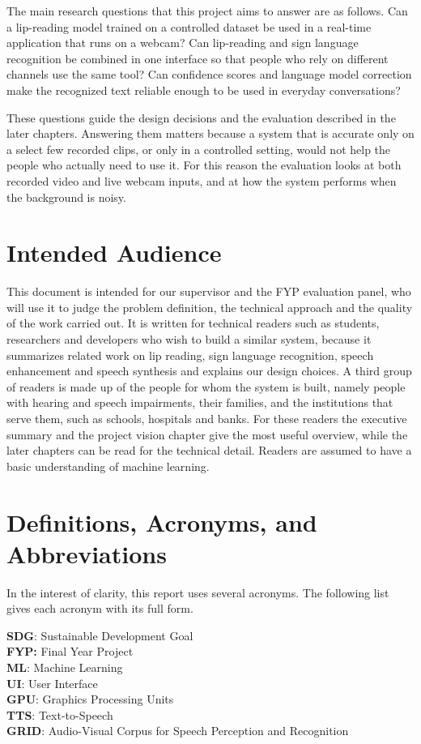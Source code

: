 \documentclass{FastFyp}
\begin{document}
The main research questions that this project aims to answer are as follows. 
Can a lip-reading model trained on a controlled dataset be used in a real-time application that runs on a webcam? 
Can lip-reading and sign language recognition be combined in one interface so that people who rely on different channels use the same tool? 
Can confidence scores and language model correction make the recognized text reliable enough to be used in everyday conversations? 

These questions guide the design decisions and the evaluation described in the later chapters. Answering them matters because a system that is accurate only on a select few recorded clips, or only in a controlled setting, would not help the people who actually need to use it. 
For this reason the evaluation looks at both recorded video and live webcam inputs, and at how the system performs when the background is noisy.

\section{Intended Audience}
This document is intended for our supervisor and the FYP evaluation panel, who will use it to judge the problem definition, the technical approach and the quality of the work carried out. It is written for technical readers such as students, researchers and developers who wish to build a similar system, because it summarizes related work on lip reading, sign language recognition, speech enhancement and speech synthesis and explains our design choices. A third group of readers is made up of the people for whom the system is built, namely people with hearing and speech impairments, their families, and the institutions that serve them, such as schools, hospitals and banks. For these readers the executive summary and the project vision chapter give the most useful overview, while the later chapters can be read for the technical detail. Readers are assumed to have a basic understanding of machine learning.
\section{Definitions, Acronyms, and Abbreviations}
In the interest of clarity, this report uses several acronyms. The following list gives each acronym with its full form.

\textbf{SDG}: Sustainable Development Goal\\
\textbf{FYP:} Final Year Project\\
\textbf{ML}: Machine Learning\\
\textbf{UI}: User Interface\\
\textbf{GPU}: Graphics Processing Units\\
\textbf{TTS}: Text-to-Speech\\
\textbf{GRID}: Audio-Visual Corpus for Speech Perception and Recognition\\
\end{document}
